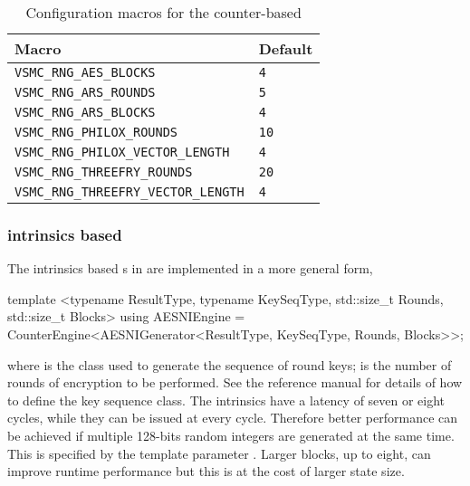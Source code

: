 \begin{table}[t]
  \begin{tabu}{X[l]X[l]}
    \toprule
    Macro & Default \\
    \midrule
    \texttt{VSMC\_RNG\_AES\_BLOCKS} & \texttt{4} \\
    \texttt{VSMC\_RNG\_ARS\_ROUNDS} & \texttt{5} \\
    \texttt{VSMC\_RNG\_ARS\_BLOCKS} & \texttt{4} \\
    \texttt{VSMC\_RNG\_PHILOX\_ROUNDS} & \texttt{10} \\
    \texttt{VSMC\_RNG\_PHILOX\_VECTOR\_LENGTH} & \texttt{4} \\
    \texttt{VSMC\_RNG\_THREEFRY\_ROUNDS} & \texttt{20} \\
    \texttt{VSMC\_RNG\_THREEFRY\_VECTOR\_LENGTH} & \texttt{4} \\
    \bottomrule
  \end{tabu}
  \caption{Configuration macros for the counter-based \rng}
  \label{tab:Configuration macros for the counter-based RNG}
\end{table}

\subsubsection{\protect\aesni intrinsics based \protect\rng}
\label{ssub:AES-NI intrinsics based RNG}

The \aesni intrinsics based \rng{}s in \textcite{Salmon:2011um} are implemented
in a more general form,
\begin{cppcode}
  template <typename ResultType, typename KeySeqType, std::size_t Rounds,
  std::size_t Blocks>
  using AESNIEngine =
  CounterEngine<AESNIGenerator<ResultType, KeySeqType, Rounds, Blocks>>;
\end{cppcode}
where  is the class used to generate the sequence of
round keys;  is the number of rounds of \aes encryption to be
performed. See the reference manual for details of how to define the key
sequence class. The \aesni intrinsics have a latency of seven or eight cycles,
while they can be issued at every cycle. Therefore better performance can be
achieved if multiple 128-bits random integers are generated at the same time.
This is specified by the template parameter . Larger blocks,
up to eight, can improve runtime performance but this is at the cost of larger
state size.

